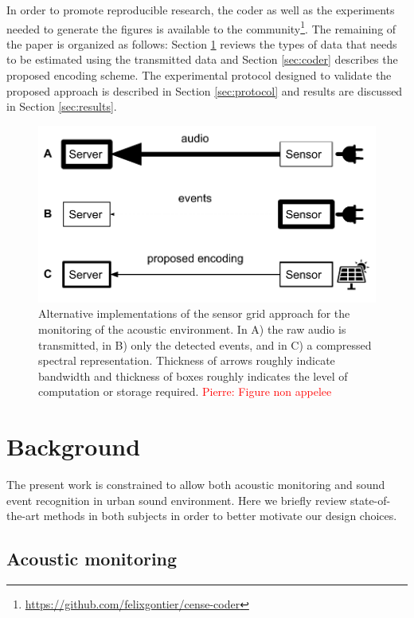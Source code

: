 \documentclass[final,3p,times,twocolumn]{elsarticle}
\newcommand{\pa}[1]{\textcolor{red}{ Pierre: #1}}
\begin{document}
In order to promote reproducible research, the coder as well as the experiments needed to generate the figures is available to the community\footnote{\url{https://github.com/felixgontier/cense-coder}}. The remaining of the paper is organized as follows: Section \ref{sec:background} reviews the types of data that needs to be estimated using the transmitted data and Section \ref{sec:coder} describes the proposed encoding scheme. The experimental protocol designed to validate the proposed approach is described in Section \ref{sec:protocol} and results are discussed in Section \ref{sec:results}.


\begin{figure}[t]
\includegraphics[width=\columnwidth]{figures/censeCoder}
\vspace{-0.15in}
\caption{Alternative implementations of the sensor grid approach for the monitoring of the acoustic environment. In A) the raw audio is transmitted, in B) only the detected events, and in C) a compressed spectral representation. Thickness of arrows roughly indicate bandwidth and thickness of boxes roughly indicates the level of computation or storage required.\pa{Figure non appelee}}
\label{fig:codingScheme}
\end{figure}


\section{Background} \label{sec:background}


The present work is constrained to allow both acoustic monitoring and sound event recognition in urban sound environment. Here we briefly review state-of-the-art methods in both subjects in order to better motivate our design choices.

\subsection{Acoustic monitoring}
\end{document}
